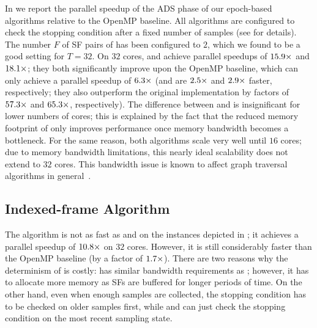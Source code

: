 In  we report the parallel
speedup of the ADS phase of our epoch-based algorithms
relative to the OpenMP baseline.
All algorithms are configured to check the stopping condition
after a fixed number of samples (see 
for details). The number $F$ of SF pairs of \sharedframe
has been configured to $2$, which we found to be a good setting
for $T = 32$. On $32$ cores, \localframe and \sharedframe achieve
parallel speedups of $\onedigit{\adsParallelSuLf}\times$
and $\onedigit{\adsParallelSuSf}\times$; they both significantly
improve upon the OpenMP baseline, which can only
achieve a parallel speedup of $\onedigit{\adsParallelSuNaive}\times$
(\ie \localframe and \sharedframe are $\onedigit{\adsSuLfVsOmp}\times$
and $\onedigit{\adsSuSfVsOmp}\times$ faster, respectively;
they also outperform the original implementation by
factors of $\onedigit{\adsSuLfVsOriginal}\times$ and
$\onedigit{\adsSuSfVsOriginal}\times$, respectively).
%
The difference between \localframe and \sharedframe is insignificant
for lower numbers of cores; this is explained by the fact that the reduced
memory footprint of \sharedframe only improves performance once memory
bandwidth becomes a bottleneck. For the same reason, both algorithms
scale very well until $16$ cores; due to memory bandwidth limitations,
this nearly ideal scalability does not extend to $32$ cores.
This bandwidth issue is known to affect graph traversal algorithms
in general~\cite{DBLP:conf/icpp/BaderCF05,DBLP:journals/ppl/LumsdaineGHB07}.

\subsection{Indexed-frame Algorithm}
\label{sec:betw-apx:exp-indexed-frame}
%
The \indexedframe algorithm is not as fast as \localframe and \sharedframe on
the instances depicted in ; it achieves a
parallel speedup of $\onedigit{\adsParallelSuDt}\times$ on $32$ cores. However,
it is still considerably faster than the OpenMP baseline (by a factor of
$\onedigit{\adsSuDtVsOmp}\times$). There are two reasons why the determinism of
\indexedframe is costly: \indexedframe has similar bandwidth requirements as
\localframe; however, it has to allocate more memory as SFs are buffered for
longer periods of time. On the other hand, even when enough samples are
collected, the stopping condition has to be checked on older samples first,
while \localframe and \sharedframe can just check the stopping condition on the
most recent sampling state.

